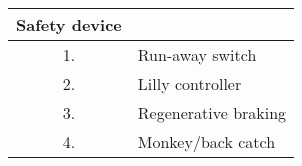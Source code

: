 \begin{tabular}[12pt]{ |c|l| }
\hline
\textbf{Safety device} & \\ \hline
1. & Run-away switch \\ \hline
2. & Lilly controller \\ \hline
3. & Regenerative braking \\ \hline
4. & Monkey/back catch \\ \hline
\end{tabular}
